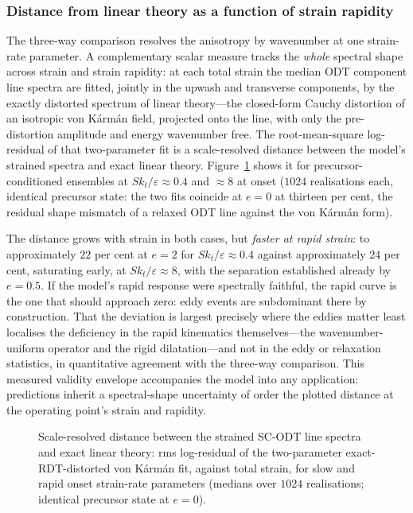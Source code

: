 \documentclass[11pt,a4paper]{article}
\begin{document}
\subsubsection{Distance from linear theory as a function of strain
rapidity}\label{sec:envelope}

The three-way comparison resolves the anisotropy by wavenumber at one
strain-rate parameter. A complementary scalar measure tracks the
\emph{whole} spectral shape across strain and strain rapidity: at each
total strain the median ODT component line spectra are fitted, jointly in
the upwash and transverse components, by the exactly distorted spectrum of
linear theory---the closed-form Cauchy distortion of an isotropic von
K\'arm\'an field, projected onto the line, with only the pre-distortion
amplitude and energy wavenumber free. The root-mean-square log-residual of
that two-parameter fit is a scale-resolved distance between the model's
strained spectra and exact linear theory. Figure~\ref{fig:rdt-distance}
shows it for precursor-conditioned ensembles at $Sk_t/\varepsilon\approx0.4$
and $\approx8$ at onset ($1024$ realisations each, identical precursor
state: the two fits coincide at $e=0$ at thirteen per cent, the residual
shape mismatch of a relaxed ODT line against the von K\'arm\'an form).

The distance grows with strain in both cases, but \emph{faster at rapid
strain}: to approximately $22$ per cent at $e=2$ for
$Sk_t/\varepsilon\approx0.4$ against approximately $24$ per cent,
saturating early, at $Sk_t/\varepsilon\approx8$, with the separation
established already by $e=0.5$. If the model's rapid response were
spectrally faithful, the rapid curve is the one that should approach zero:
eddy events are subdominant there by construction. That the deviation is
largest precisely where the eddies matter least localises the deficiency in
the rapid kinematics themselves---the wavenumber-uniform operator and the
rigid dilatation---and not in the eddy or relaxation statistics, in
quantitative agreement with the three-way comparison. This measured
validity envelope accompanies the model into any application: predictions
inherit a spectral-shape uncertainty of order the plotted distance at the
operating point's strain and rapidity.

\begin{figure}
  \centering
  \caption{Scale-resolved distance between the strained SC-ODT line spectra
  and exact linear theory: rms log-residual of the two-parameter
  exact-RDT-distorted von K\'arm\'an fit, against total strain, for slow
  and rapid onset strain-rate parameters (medians over $1024$
  realisations; identical precursor state at $e=0$).}
  \label{fig:rdt-distance}
\end{figure}
\end{document}
